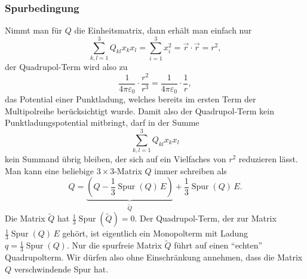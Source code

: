 \subsubsection{Spurbedingung}
Nimmt man für $Q$ die Einheitsmatrix, dann erhält man einfach nur
\[
\sum_{k,l=1}^3 Q_{kl}x_kx_l=\sum_{i=1}^3 x_i^2 = \vec{r}\cdot\vec{r}=r^2,
\]
der Quadrupol-Term wird also  zu
\[
\frac1{4\pi\varepsilon_0}\cdot\frac{r^2}{r^3}
=
\frac1{4\pi\varepsilon_0}\cdot\frac{1}{r},
\]
das Potential einer Punktladung, welches bereits im ersten Term
der Multipolreihe berücksichtigt wurde.
Damit also der Quadrupol-Term kein Punktladungspotential mitbringt,
darf in der Summe
\[
\sum_{k,l=1}^3Q_{kl}x_kx_l
\]
kein Summand übrig bleiben, der sich auf ein Vielfaches von $r^2$ 
reduzieren lässt.
Man kann eine beliebige $3\times 3$-Matrix $Q$ immer schreiben als
\[
Q = \underbrace{(Q - {\textstyle \frac13}\operatorname{Spur}(Q)\, E)}_{\displaystyle \tilde Q} + {\textstyle\frac13}\operatorname{Spur} (Q)\, E.
\]
Die Matrix $\tilde Q$ hat $\frac13\operatorname{Spur}(\tilde Q)=0$.
Der Quadrupol-Term, der zur Matrix $\frac13\operatorname{Spur}(Q)\,E$ gehört,
ist eigentlich ein Monopolterm mit Ladung $q=\frac13\operatorname{Spur}(Q)$.
Nur die spurfreie Matrix $\tilde Q$ führt auf einen ``echten'' Quadrupolterm.
Wir dürfen also ohne Einschränkung annehmen, dass die Matrix $Q$ verschwindende
Spur hat.

